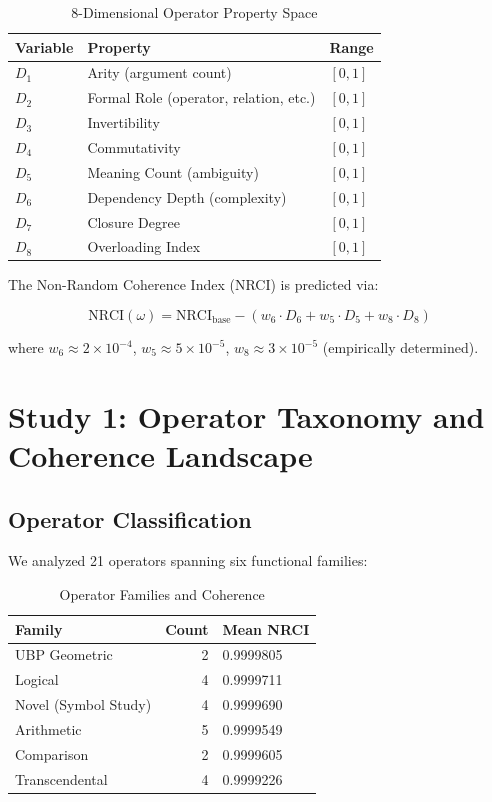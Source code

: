 \documentclass[12pt,a4paper]{article}
\begin{document}
\begin{table}[h]
\centering
\begin{tabular}{lll}
\toprule
\textbf{Variable} & \textbf{Property} & \textbf{Range} \\
\midrule
$D_1$ & Arity (argument count) & $[0, 1]$ \\
$D_2$ & Formal Role (operator, relation, etc.) & $[0, 1]$ \\
$D_3$ & Invertibility & $[0, 1]$ \\
$D_4$ & Commutativity & $[0, 1]$ \\
$D_5$ & Meaning Count (ambiguity) & $[0, 1]$ \\
$D_6$ & Dependency Depth (complexity) & $[0, 1]$ \\
$D_7$ & Closure Degree & $[0, 1]$ \\
$D_8$ & Overloading Index & $[0, 1]$ \\
\bottomrule
\end{tabular}
\caption{8-Dimensional Operator Property Space}
\label{tab:d_variables}
\end{table}

The Non-Random Coherence Index (NRCI) is predicted via:

\begin{equation}
\text{NRCI}(\omega) = \text{NRCI}_{\text{base}} - (w_6 \cdot D_6 + w_5 \cdot D_5 + w_8 \cdot D_8)
\end{equation}

where $w_6 \approx 2 \times 10^{-4}$, $w_5 \approx 5 \times 10^{-5}$, $w_8 \approx 3 \times 10^{-5}$ (empirically determined).

\section{Study 1: Operator Taxonomy and Coherence Landscape}

\subsection{Operator Classification}

We analyzed 21 operators spanning six functional families:

\begin{table}[h]
\centering
\begin{tabular}{lrl}
\toprule
\textbf{Family} & \textbf{Count} & \textbf{Mean NRCI} \\
\midrule
UBP Geometric & 2 & 0.9999805 \\
Logical & 4 & 0.9999711 \\
Novel (Symbol Study) & 4 & 0.9999690 \\
Arithmetic & 5 & 0.9999549 \\
Comparison & 2 & 0.9999605 \\
Transcendental & 4 & 0.9999226 \\
\bottomrule
\end{tabular}
\caption{Operator Families and Coherence}
\label{tab:families}
\end{table}
\end{document}
